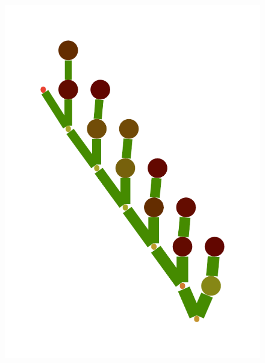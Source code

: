 \documentclass[a4paper,10pt]{article}
\begin{document}
\begin{figure}
{    \includegraphics[scale=.14]{../figures/vector/6-4-vine-induced-3.pdf}
}
\end{figure}
\end{document}
